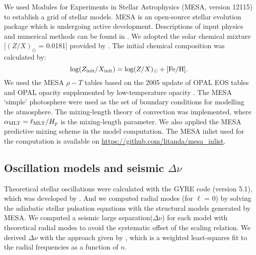 We used Modules for Experiments in Stellar Astrophysics
(\textsc{MESA}, version 12115) to establish a grid of stellar models. 
\textsc{MESA} is an open-source stellar evolution package which is undergoing active development. Descriptions of input physics and numerical methods
can be found in \citet{2011ApJS..192....3P,2013ApJS..208....4P, 2015ApJS..220...15P}.
We adopted the solar chemical mixture [$(Z/X)_{\odot}$ = 0.0181]
provided by \citet{2009ARA&A..47..481A}. 
The initial chemical composition was calculated by: 
\begin{equation}
\log (Z_{\rm{init}}/X_{\rm{init}}) = \log (Z/X)_{\odot} + \rm{[Fe/H]}.  \\
\end{equation}
We used the \textsc{MESA} $\rho-T$ tables based on the 2005
update of OPAL EOS tables \citep{2002ApJ...576.1064R} and OPAL opacity
supplemented by low-temperature opacity \citep{2005ApJ...623..585F}. 
The MESA ‘simple’ photosphere were used as the set of boundary conditions for modelling the atmosphere.
The mixing-length theory of convection was implemented, where 
$\alpha_{\rm MLT} = \ell_{\rm MLT}/H_p$ is the mixing-length parameter.
We also applied the \textsc{MESA} predictive mixing scheme \citep{2018ApJS..234...34P,2019ApJS..243...10P}  in the model computation. The \textsc{MESA} inlist used for the computation is available on \url{https://github.com/litanda/mesa_inlist}.  

\subsection{Oscillation models and seismic $\Delta \nu$}\label{subsec:seismo_model}

Theoretical stellar oscillations were calculated with the \textsc{GYRE} code (version 5.1), which was developed by \citet{2013MNRAS.435.3406T}. And we computed radial modes (for $\ell$ = 0) by solving the adiabatic stellar pulsation equations with the structural models generated by \textsc{MESA}. We computed a seismic large separation($\Delta \nu$) for each model with theoretical radial modes to avoid the systematic offset of the scaling relation. We derived $\Delta \nu$ with the approach given by \citet{2011ApJ...743..161W}, which is a weighted least-squares fit to the radial frequencies as a function of $n$.  


